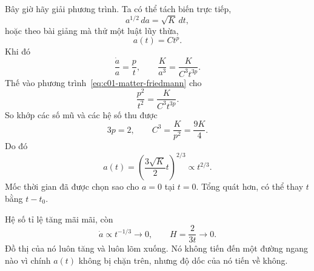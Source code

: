 Bây giờ hãy giải phương trình. Ta có thể tách biến trực tiếp,
\begin{equation}
a^{1/2}\,da=\sqrt{K}\,dt,
\end{equation}
hoặc theo bài giảng mà thử một luật lũy thừa,
\begin{equation}
a(t)=Ct^p.
\label{eq:c01-power-trial}
\end{equation}
Khi đó
\begin{equation}
\frac{\dot a}{a}=\frac{p}{t},
\qquad
\frac{K}{a^3}=\frac{K}{C^3t^{3p}}.
\end{equation}
Thế vào phương trình~\eqref{eq:c01-matter-friedmann} cho
\begin{equation}
\frac{p^2}{t^2}=\frac{K}{C^3t^{3p}}.
\end{equation}
So khớp các số mũ và các hệ số thu được
\begin{equation}
3p=2,
\qquad
C^3=\frac{K}{p^2}=\frac{9K}{4}.
\end{equation}
Do đó
\begin{equation}
\boxed{
a(t)=\left(\frac{3\sqrt K}{2}t\right)^{2/3}\propto t^{2/3}.
}
\label{eq:c01-two-thirds}
\end{equation}
Mốc thời gian đã được chọn sao cho \(a=0\) tại \(t=0\). Tổng quát hơn, có thể thay \(t\) bằng \(t-t_0\).

Hệ số tỉ lệ tăng mãi mãi, còn
\begin{equation}
\dot a\propto t^{-1/3}\longrightarrow0,
\qquad
H=\frac{2}{3t}\longrightarrow0.
\label{eq:c01-asymptotic-slope}
\end{equation}
Đồ thị của nó luôn tăng và luôn lõm xuống. Nó không tiến đến một đường ngang nào vì chính \(a(t)\) không bị chặn trên, nhưng độ dốc của nó tiến về không.

\begin{classroomqa}
\end{classroomqa}

\begin{classroomqa}
\end{classroomqa}

